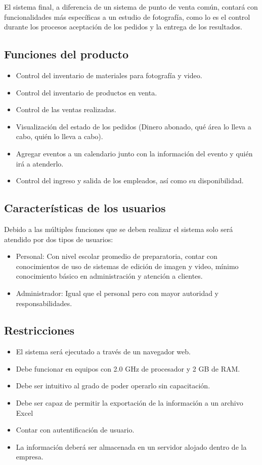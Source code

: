 El sistema final, a diferencia de un sistema de punto de venta común, contará con funcionalidades más específicas a un estudio de fotografía, como lo es el control durante los procesos aceptación de los pedidos y la entrega de los resultados.

\subsection{Funciones del producto}
\begin{itemize}
\item Control del inventario de materiales para fotografía y video.
\item Control del inventario de productos en venta.
\item Control de las ventas realizadas.
\item Visualización del estado de los pedidos (Dinero abonado, qué área lo lleva a cabo, quién lo lleva a cabo).
\item Agregar eventos a un calendario junto con la información del evento y quién irá a atenderlo.
\item Control del ingreso y salida de los empleados, así como su disponibilidad.
\end{itemize}

\subsection{Características de los usuarios}

Debido a las múltiples funciones que se deben realizar el sistema solo será atendido por dos tipos de usuarios:
\begin{itemize}
\item Personal: Con nivel escolar promedio de preparatoria, contar con conocimientos de uso de sistemas de edición de imagen y video, mínimo conocimiento básico en administración y atención a clientes.
\item Administrador: Igual que el personal pero con mayor autoridad y responsabilidades.	
\end{itemize}

\subsection{Restricciones}
\begin{itemize}
\item El sistema será ejecutado a través de un navegador web.
\item Debe funcionar en equipos con 2.0 GHz de procesador y 2 GB de RAM.
\item Debe ser intuitivo al grado de poder operarlo sin capacitación.
\item Debe ser capaz de permitir la exportación de la información a un archivo Excel
\item Contar con autentificación de usuario.
\item La información deberá ser almacenada en un servidor alojado dentro de la empresa.
\end{itemize}

